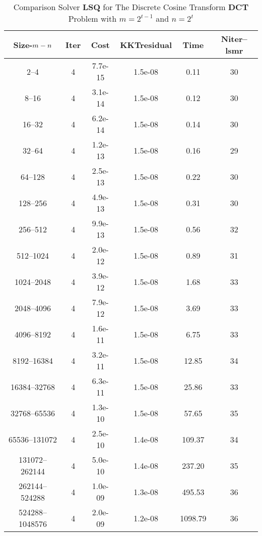 \documentclass[letterpaper,12pt,oneside,final]{book}
\begin{document}
\begin{table}
\caption{Comparison Solver {\bf LSQ}  for  The Discrete Cosine Transform {\bf DCT} Problem with $m=2^{t-1}$ and $n=2^{t}$}  
\begin{center}
\begin{tabular}{|*{6}{c}|} \hline
Size-$m\--n$ & \multicolumn{1}{c}{Iter} & \multicolumn{1}{c}{Cost}& \multicolumn{1}{c}{KKTresidual} & \multicolumn{1}{c}{Time} & \multicolumn{1}{c|}{Niter--lsmr} \\ 
\hline
2--4           &4    &7.7e-15        &1.5e-08        &0.11           &30   \\ 
8--16          &4    &3.1e-14        &1.5e-08        &0.12           &30   \\ 
16--32         &4    &6.2e-14        &1.5e-08        &0.14           &30   \\ 
32--64         &4    &1.2e-13        &1.5e-08        &0.16           &29   \\ 
64--128        &4    &2.5e-13        &1.5e-08        &0.22           &30   \\ 
128--256       &4    &4.9e-13        &1.5e-08        &0.31           &30   \\ 
256--512       &4    &9.9e-13        &1.5e-08        &0.56           &32   \\ 
512--1024      &4    &2.0e-12        &1.5e-08        &0.89           &31   \\ 
1024--2048     &4    &3.9e-12        &1.5e-08        &1.68           &33   \\ 
2048--4096     &4    &7.9e-12        &1.5e-08        &3.69           &33   \\ 
4096--8192     &4    &1.6e-11        &1.5e-08        &6.75           &33   \\ 
8192--16384    &4    &3.2e-11        &1.5e-08        &12.85          &34   \\ 
16384--32768   &4    &6.3e-11        &1.5e-08        &25.86          &33   \\ 
32768--65536   &4    &1.3e-10        &1.5e-08        &57.65          &35   \\ 
65536--131072  &4    &2.5e-10        &1.4e-08        &109.37         &34   \\ 
131072--262144 &4    &5.0e-10        &1.4e-08        &237.20         &35   \\ 
262144--524288 &4    &1.0e-09        &1.3e-08        &495.53         &36   \\ 
524288--1048576&4    &2.0e-09        &1.2e-08        &1098.79        &36   \\
\hline
\end{tabular}
\end{center}
\end{table}
\end{document}
